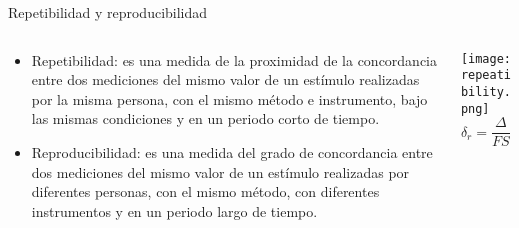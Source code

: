 \documentclass[aspectratio=169]{beamer}
\begin{document}
\begin{frame}{Repetibilidad y reproducibilidad}
    \begin{columns}[c, onlytextwidth]
        \begin{column}{0.60\textwidth}
            \begin{itemize}
                \item Repetibilidad: es una medida de la proximidad de la concordancia entre dos mediciones del mismo valor de un estímulo realizadas por la misma persona, con el mismo método e instrumento, bajo las mismas condiciones y en un periodo corto de tiempo. 
                \item Reproducibilidad: es una medida del grado de concordancia entre dos mediciones del mismo valor de un estímulo realizadas por diferentes personas, con el mismo método, con diferentes instrumentos y en un periodo largo de tiempo. 
            \end{itemize}
        \end{column}
        \begin{column}{0.35\textwidth}
            \texttt{[image: repeatibility.png]}\cite{Fraden_2016}
            \begin{equation*}
                \delta_r = \dfrac{\Delta}{FS}\cdot 100\%
            \end{equation*}
        \end{column}
    \end{columns}
\end{frame}
\end{document}
